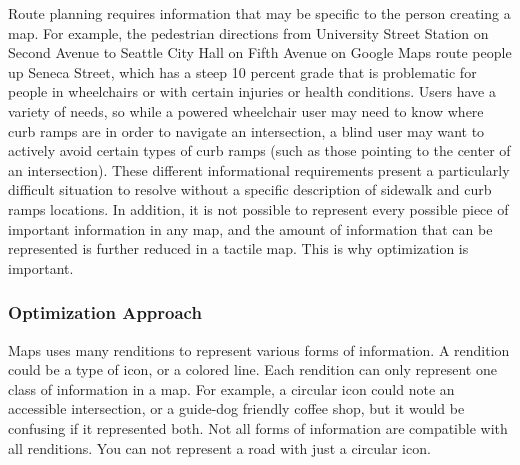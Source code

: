 Route planning requires information that may be specific to the person creating a map. For example, the pedestrian directions from University Street Station on Second Avenue to Seattle City Hall on Fifth Avenue on Google Maps route people up Seneca Street, which has a steep 10 percent grade that is problematic for people in wheelchairs or with certain injuries or health conditions. %
Users have a variety of needs, so while a powered wheelchair user may need to know where curb ramps are in order to navigate an intersection, a blind user may want to actively avoid certain types of curb ramps (such as those pointing to the center of an intersection). These different informational requirements present a particularly difficult situation to resolve without a specific description of sidewalk and curb ramps locations. In addition, it is not possible to represent every possible piece of important information in any map, and the amount of information that can be represented is further reduced in a tactile map. This is why optimization is important.

\subsubsection{Optimization Approach}
Maps uses many renditions to represent various forms of information. A  rendition could be a type of icon, or a colored line. Each rendition can only represent one class of information in a map. For example, a circular icon could note an accessible intersection, or a guide-dog friendly coffee shop, but it would be confusing if it represented both. Not all forms of information are compatible with all renditions. You can not represent a road with just a circular icon. 

